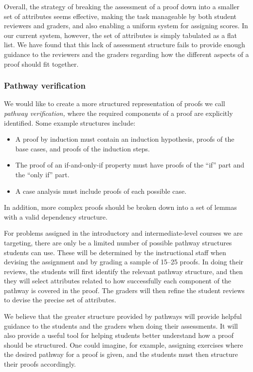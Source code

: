\documentclass[12pt]{article}
\begin{document}
Overall, the strategy of breaking the assessment of a proof down into a smaller
set of attributes seems effective, making the task manageable by
both student reviewers and graders, and also enabling a uniform
system for assigning scores.  In our current system, however, the set
of attributes is simply tabulated as a flat list.  We have found that
this lack of assessment structure fails to provide enough guidance to the
reviewers and the graders regarding how the different aspects of a
proof should fit together.

\subsubsection*{Pathway verification}

We would like to
create a more structured representation of proofs we call {\em pathway
  verification,}  where the required components of a proof are
explicitly identified.  Some example structures include:
\begin{itemize}
\item A proof by induction must contain an induction hypothesis,
  proofs of the base cases, and proofs of the induction steps.
\item The proof of an if-and-only-if property must have proofs of the
  ``if'' part and the ``only if'' part.
\item A case analysis must include proofs of each possible case.
\end{itemize}
In addition, more complex proofs should be broken down into a set of
lemmas with a valid dependency structure.

For problems assigned in the introductory and intermediate-level
courses we are targeting, there are only be a limited number of
possible pathway structures students can use.  These will be
determined by the instructional staff when devising the assignment and
by grading a sample of 15--25 proofs.  In doing their reviews, the
students will first identify the relevant pathway structure, and then
they will select attributes related to how successfully each component
of the pathway is covered in the proof.  The graders will then refine
the student reviews to devise the precise set of attributes.

We believe that the greater structure provided by pathways will
provide helpful guidance to the students and the graders when doing
their assessments.  It will also provide a useful tool for helping
students better understand how a proof should be structured.  One
could imagine, for example, assigning exercises where the
desired pathway for a proof is given, and the students must
then structure their proofs accordingly.
\end{document}
